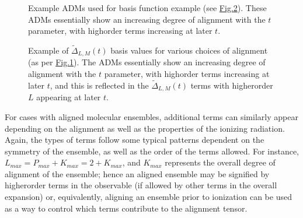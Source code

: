 \documentclass[letterpaper,table,10pt,english]{jupyterBook}
\begin{document}
\begin{figure}[htbp]
\centering
\capstart

\noindent{}
\caption{Example ADMs used for {\hyperref[\detokenize{backmatter/glossary:term-AF}]{}} basis function example (see \hyperref[\detokenize{part1/theory_tensor_formalism_201122:fig-afterm-linearramp}]{Fig.\@ \ref{\detokenize{part1/theory_tensor_formalism_201122:fig-afterm-linearramp}}}). These ADMs essentially show an increasing degree of alignment with the \(t\) parameter, with high\sphinxhyphen{}order terms increasing at later \(t\).}\label{\detokenize{part1/theory_tensor_formalism_201122:fig-adms-linearramp}}\end{figure}

\begin{figure}[htbp]
\centering
\capstart

\noindent{}
\caption{Example of \(\tilde{\Delta}_{L,M}(t)\) basis values for various choices of alignment (as per \hyperref[\detokenize{part1/theory_tensor_formalism_201122:fig-adms-linearramp}]{Fig.\@ \ref{\detokenize{part1/theory_tensor_formalism_201122:fig-adms-linearramp}}}). The ADMs essentially show an increasing degree of alignment with the \(t\) parameter, with high\sphinxhyphen{}order terms increasing at later \(t\), and this is reflected in the \(\tilde{\Delta}_{L,M}(t)\) terms with higher\sphinxhyphen{}order \(L\) appearing at later \(t\).}\label{\detokenize{part1/theory_tensor_formalism_201122:fig-afterm-linearramp}}\end{figure}

\sphinxAtStartPar
For cases with aligned molecular ensembles, additional terms can similarly appear depending on the alignment as well as the properties of the ionizing radiation. Again, the types of terms follow some typical patterns dependent on the symmetry of the ensemble, as well as the order of the terms allowed. For instance, \(L_{max}=P_{max}+K_{max}=2+K_{max}\), and \(K_{max}\) represents the overall degree of alignment of the ensemble; hence an aligned ensemble may be signified by higher\sphinxhyphen{}order terms in the observable (if allowed by other terms in the overall expansion) or, equivalently, aligning an ensemble prior to ionization can be used as a way to control which terms contribute to the alignment tensor.
\end{document}
